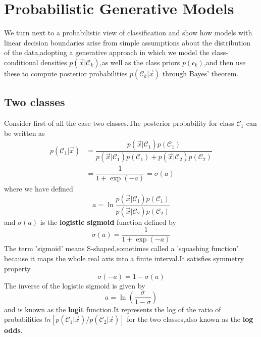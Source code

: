 \section{Probabilistic Generative Models}
We turn next to a probabilistic view of classification and show how models with linear decision boundaries arise from simple assumptions about the distribution of the data,adopting a generative approach in which we model the class-conditional densities $p(\vec{x}|\mathcal{C}_k)$,as well as the class priors $p(\mathcal{c}_k)$,and then use these to compute posterior probabilities $p(\mathcal{C}_k|\vec{x})$ through Bayes' theorem.

\subsection{Two classes}
Consider first of all the case two classes.The posterior probability for class $\mathcal{C}_1$ can be written as 
\begin{align}
p(\mathcal{C}_1|\vec{x}) &= \dfrac{p(\vec{x}|\mathcal{C}_1)p(\mathcal{C}_1)}{p(\vec{x}|\mathcal{C}_1)p(\mathcal{C}_1)+p(\vec{x}|\mathcal{C}_2)p(\mathcal{C}_2)} \\
&= \dfrac{1}{1+\exp(-a)} = \sigma(a)
\end{align}
where we have defined
\begin{equation}
a = \ln \dfrac{p(\vec{x}|\mathcal{C}_1)p(\mathcal{C}_1)}{p(\vec{x}|\mathcal{C}_2)p(\mathcal{C}_2)}
\end{equation}
and $\sigma(a)$ is the \textbf{logistic sigmoid} function defined by
\begin{equation}
\sigma(a) = \dfrac{1}{1+\exp(-a)}
\end{equation}
The term 'sigmoid' means S-shaped,sometimes called a 'squashing function' because it maps the whole real axis into a finite interval.It satisfies symmetry property
\begin{equation}
\sigma(-a) = 1 - \sigma(a)
\end{equation}
The inverse of the logistic sigmoid is given by 
\begin{equation}
a = \ln(\dfrac{\sigma}{1-\sigma})
\end{equation}
and is known as the \textbf{logit} function.It represents the log of the ratio of probabilities $ln[p(\mathcal{C}_1|\vec{x})/p(\mathcal{C}_2|\vec{x})]$ for the two classes,also known as the \textbf{log odds}.
